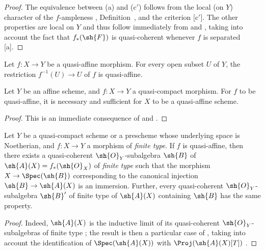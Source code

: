 \begin{proof}
The equivalence between (a) and (c$'$) follows from the local (on $Y$) character of the $f$-ampleness , Definition~, and the criterion [c$'$].
The other properties are local on $Y$
and thus follow immediately from  and , taking into account the fact that $f_*(\sh{F})$ is quasi-coherent whenever $f$ is separated [a].
\end{proof}

\begin{corollary}[5.1.7]
\label{II.5.1.7}
Let $f:X\to Y$ be a quasi-affine morphism.
For every open subset $U$ of $Y$, the restriction $f^{-1}(U)\to U$ of $f$ is quasi-affine.
\end{corollary}

\begin{corollary}[5.1.8]
\label{II.5.1.8}
Let $Y$ be an affine scheme, and $f:X\to Y$ a quasi-compact morphism.
For $f$ to be quasi-affine, it is necessary and sufficient for $X$ to be a quasi-affine scheme.
\end{corollary}

\begin{proof}
This is an immediate consequence of  and .
\end{proof}

\begin{corollary}[5.1.9]
\label{II.5.1.9}
Let $Y$ be a quasi-compact scheme or a prescheme whose underlying space is Noetherian, and $f:X\to Y$ a morphism of \emph{finite type}.
If $f$ is quasi-affine, then there exists a quasi-coherent $\sh{O}_Y$-subalgebra $\sh{B}$ of $\sh{A}(X)=f_*(\sh{O}_X)$ of \emph{finite type}  such that the morphism $X\to\Spec(\sh{B})$ corresponding to the canonical injection $\sh{B}\to\sh{A}(X)$ is an immersion.
Further, every quasi-coherent $\sh{O}_Y$-subalgebra $\sh{B}'$ of finite type of $\sh{A}(X)$ containing $\sh{B}$ has the same property.
\end{corollary}

\begin{proof}
Indeed, $\sh{A}(X)$ is the inductive limit of its quasi-coherent $\sh{O}_Y$-subalgebras of finite type ;
the result is then a particular case of , taking into account the identification of $\Spec(\sh{A}(X))$ with $\Proj(\sh{A}(X)[T])$ .
\end{proof}

